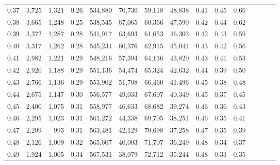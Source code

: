 \begin{tabular}{rrrcrrrrrrrrrrr}
0.37 &   3,725 &  1,321 &                                       0.26 &  534,880 &   70,730 &   59,118 &   48,838 &  0.41 &  0.45 &                         0.66 \\
0.38 &   3,665 &  1,248 &                                       0.25 &  538,545 &   67,065 &   60,366 &   47,590 &  0.42 &  0.44 &                         0.62 \\
0.39 &   3,372 &  1,287 &                                       0.28 &  541,917 &   63,693 &   61,653 &   46,303 &  0.42 &  0.43 &                         0.59 \\
0.40 &   3,317 &  1,262 &                                       0.28 &  545,234 &   60,376 &   62,915 &   45,041 &  0.43 &  0.42 &                         0.56 \\
0.41 &   2,982 &  1,221 &                                       0.29 &  548,216 &   57,394 &   64,136 &   43,820 &  0.43 &  0.41 &                         0.53 \\
0.42 &   2,920 &  1,188 &                                       0.29 &  551,136 &   54,474 &   65,324 &   42,632 &  0.44 &  0.39 &                         0.50 \\
0.43 &   2,766 &  1,136 &                                       0.29 &  553,902 &   51,708 &   66,460 &   41,496 &  0.45 &  0.38 &                         0.48 \\
0.44 &   2,675 &  1,147 &                                       0.30 &  556,577 &   49,033 &   67,607 &   40,349 &  0.45 &  0.37 &                         0.45 \\
0.45 &   2,400 &  1,075 &                                       0.31 &  558,977 &   46,633 &   68,682 &   39,274 &  0.46 &  0.36 &                         0.43 \\
0.46 &   2,295 &  1,023 &                                       0.31 &  561,272 &   44,338 &   69,705 &   38,251 &  0.46 &  0.35 &                         0.41 \\
0.47 &   2,209 &    993 &                                       0.31 &  563,481 &   42,129 &   70,698 &   37,258 &  0.47 &  0.35 &                         0.39 \\
0.48 &   2,126 &  1,009 &                                       0.32 &  565,607 &   40,003 &   71,707 &   36,249 &  0.48 &  0.34 &                         0.37 \\
0.49 &   1,924 &  1,005 &                                       0.34 &  567,531 &   38,079 &   72,712 &   35,244 &  0.48 &  0.33 &                         0.35 \\

\end{tabular}

